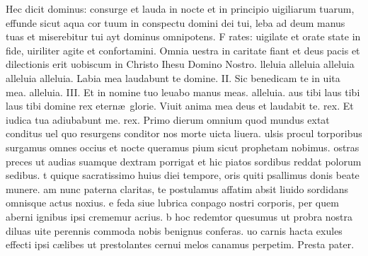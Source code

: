 \documentclass[letter,12pt]{book}
\newcommand*\zallmancaps{\usefont{U}{Zallman}{xl}{n}}
\begin{document}
\lettrine[lines=3]{\color{Blue} \zallmancaps H}{}ec dicit dominus: consurge et lauda
in nocte et in principio uigiliarum tuarum, effunde sicut aqua cor tuum in conspectu domini dei tui, leba ad deum manus tuas et miserebitur tui ayt dominus omnipotens.
\lettrine[lines=3]{\color{Blue} \zallmancaps F}{}{\color{Red} rates:} uigilate et orate state in fide, uiriliter agite et confortamini. Omnia uestra in caritate fiant et deus pacis et dilectionis erit uobiscum in Christo Ihesu Domino Nostro.
lleluia alleluia alleluia alleluia alleluia. {\color{Red} L}abia mea laudabunt te domine. {II. \color{Red} S}ic benedicam te in uita mea. alleluia. {III. \color{Red} E}t in nomine tuo leuabo manus meas. alleluia.
aus tibi laus tibi laus tibi domine rex etern\ae \ glorie. Viuit anima mea deus et laudabit te. rex. Et iudica tua adiubabunt me. rex.
\lettrine[lines=4]{\color{Red} \zallmancaps P}{}rimo dierum omnium
quod mundus extat conditus
uel quo resurgens conditor
nos morte uicta liuera.
ulsis procul torporibus
surgamus omnes occius
et nocte queramus pium
sicut prophetam nobimus.
ostras preces ut audias
suamque dextram porrigat
et hic piatos sordibus
reddat polorum sedibus.
t quique sacratissimo
huius diei tempore,
oris quiti psallimus
donis beate munere.
am nunc paterna claritas,
te postulamus affatim
absit liuido sordidans
omnisque actus noxius.
e feda siue lubrica
conpago nostri corporis,
per quem aberni ignibus
ipsi crememur acrius.
b hoc redemtor quesumus
ut probra nostra diluas
uite perennis commoda
nobis benignus conferas.
uo carnis hacta exules
effecti ipsi c\ae libes
ut prestolantes cernui
melos canamus perpetim. {\color{Red} P}resta pater.
\end{document}
